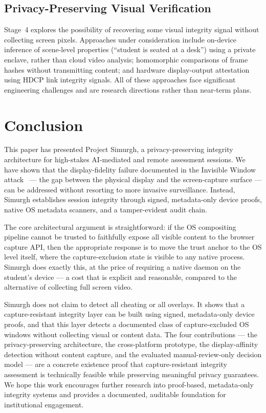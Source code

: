 \documentclass[conference]{IEEEtran}
\begin{document}
\subsection{Privacy-Preserving Visual Verification}

Stage~4 explores the possibility of recovering some visual integrity signal without collecting screen pixels. Approaches under consideration include on-device inference of scene-level properties (``student is seated at a desk'') using a private enclave, rather than cloud video analysis; homomorphic comparisons of frame hashes without transmitting content; and hardware display-output attestation using HDCP link integrity signals. All of these approaches face significant engineering challenges and are research directions rather than near-term plans.

\section{Conclusion}

This paper has presented Project Simurgh, a privacy-preserving integrity architecture for high-stakes AI-mediated and remote assessment sessions. We have shown that the display-fidelity failure documented in the Invisible Window attack~\cite{abedini2026invisible} — the gap between the physical display and the screen-capture surface — can be addressed without resorting to more invasive surveillance. Instead, Simurgh establishes session integrity through signed, metadata-only device proofs, native OS metadata scanners, and a tamper-evident audit chain.

The core architectural argument is straightforward: if the OS compositing pipeline cannot be trusted to faithfully expose all visible content to the browser capture API, then the appropriate response is to move the trust anchor to the OS level itself, where the capture-exclusion state is visible to any native process. Simurgh does exactly this, at the price of requiring a native daemon on the student's device — a cost that is explicit and reasonable, compared to the alternative of collecting full screen video.

Simurgh does not claim to detect all cheating or all overlays. It shows that a capture-resistant integrity layer can be built using signed, metadata-only device proofs, and that this layer detects a documented class of capture-excluded OS windows without collecting visual or content data. The four contributions — the privacy-preserving architecture, the cross-platform prototype, the display-affinity detection without content capture, and the evaluated manual-review-only decision model — are a concrete existence proof that capture-resistant integrity assessment is technically feasible while preserving meaningful privacy guarantees. We hope this work encourages further research into proof-based, metadata-only integrity systems and provides a documented, auditable foundation for institutional engagement.
\end{document}

